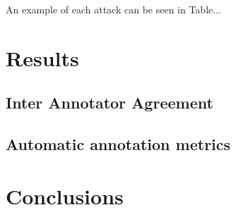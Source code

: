 \documentclass[11pt,a4paper]{article}
\begin{document}
An example of each attack can be seen in Table...

\section{Results}

\subsection{Inter Annotator Agreement}

\subsection{Automatic annotation metrics}

\section{Conclusions}



\end{document}
